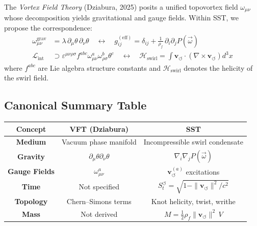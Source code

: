 \documentclass[10pt,reprint,aps,onecolumn,nofootinbib]{revtex4-2}
\begin{document}
    The \textit{Vortex Field Theory} (Dziabura, 2025) posits a unified topovortex field $\omega_{\mu\nu}$ whose decomposition yields gravitational and gauge fields. Within SST, we propose the correspondence:
    \begin{align}
        \omega_{\mu\nu}^{\text{grav}} &= \lambda\, \partial_\mu \theta \, \partial_\nu \theta \quad \longleftrightarrow \quad
        g_{ij}^{(\text{eff})} = \delta_{ij} + \frac{1}{\rho_{\!f}} \, \partial_i \partial_j P(\vec{\omega}) \\
        \mathcal{L}_{\text{int}} &\supset \varepsilon^{\mu\nu\rho\sigma} f^{abc} \omega^a_{\mu\nu} \omega^b_{\rho\sigma} \theta^c \quad \longleftrightarrow \quad \mathcal{H}_{\text{swirl}} = \int \mathbf{v}_{\!\boldsymbol{\circlearrowleft}} \cdot \left( \nabla \times \mathbf{v}_{\!\boldsymbol{\circlearrowleft}} \right) d^3x
    \end{align}
    where $f^{abc}$ are Lie algebra structure constants and $\mathcal{H}_{\text{swirl}}$ denotes the helicity of the swirl field.

\subsection*{Canonical Summary Table}

    \begin{center}
        \renewcommand{\arraystretch}{1.25}
        \begin{tabular}{|c|c|c|}
            \hline
            \textbf{Concept} & \textbf{VFT (Dziabura)} & \textbf{SST} \\
            \hline
            \textbf{Medium} & Vacuum phase manifold & Incompressible swirl condensate \\
            \textbf{Gravity} & $\partial_\mu \theta \partial_\nu \theta$ & $\nabla_i \nabla_j P(\vec{\omega})$ \\
            \textbf{Gauge Fields} & $\omega_{\mu\nu}^{a}$ & $\mathbf{v}_{\!\boldsymbol{\circlearrowleft}}^{(a)}$ excitations \\
            \textbf{Time} & Not specified & $S_t^{\!\boldsymbol{\circlearrowleft}} = \sqrt{1 - \|\mathbf{v}_{\!\boldsymbol{\circlearrowleft}}\|^2 / c^2}$ \\
            \textbf{Topology} & Chern–Simons terms & Knot helicity, twist, writhe \\
            \textbf{Mass} & Not derived & $M = \frac{1}{2} \rho_{\!f} \|\mathbf{v}_{\!\boldsymbol{\circlearrowleft}}\|^2 \, V$ \\
            \hline
        \end{tabular}
    \end{center}
\end{document}
